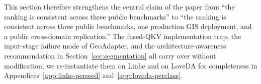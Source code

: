 This section therefore strengthens the central claim of the paper from ``the ranking is consistent across three public benchmarks'' to ``the ranking is consistent across three public benchmarks, one production GIS deployment, and a public cross-domain replication.'' The fused-QKV implementation trap, the input-stage failure mode of GeoAdapter, and the architecture-awareness recommendation in Section~\ref{sec:segmentation} all carry over without modification; we re-instantiate them on Linhe and on LoveDA for completeness in Appendices~\ref{app:linhe-perseed} and~\ref{app:loveda-perclass}.
